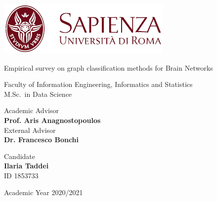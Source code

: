 
\begin{titlepage}

\noindent \includegraphics[scale=0.6]{Immagini/sapienza.PNG}\\
\vspace{10em}

{\selectfont

{\LARGE \noindent \textcolor{rossosapienza}{Empirical survey on graph classification methods for Brain Networks}}
	

\vspace{10em}

 
	\noindent \textcolor{rossosapienza}{Faculty of Information Engineering, Informatics and Statistics \\
	M.Sc.\ in Data Science}




\vspace{2em}


\vskip 2cm

\begin{multicols}{2}
\noindent Academic Advisor\\
\textbf{Prof. Aris Anagnostopoulos}\\

\noindent External Advisor\\
\textbf{Dr. Francesco Bonchi}	

\columnbreak

\noindent Candidate\\
\textbf{Ilaria Taddei}\\
ID 1853733
\end{multicols}



\vskip 1.5cm

\noindent Academic Year 2020/2021

}

\end{titlepage}